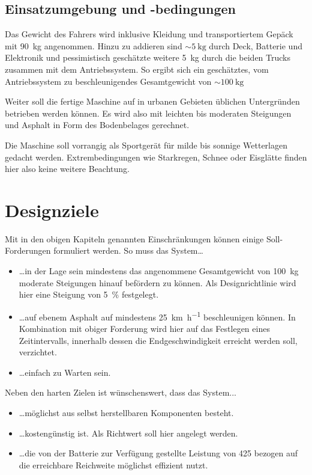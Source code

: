 		\subsection{Einsatzumgebung und -bedingungen}
			Das Gewicht des Fahrers wird inklusive Kleidung und transportiertem Gepäck mit \qty{90}{\kilo\gram} angenommen.
			Hinzu zu addieren sind \(\sim \qty{5}{\kilo\gram}\) durch Deck, Batterie und Elektronik und pessimistisch geschätzte weitere \qty{5}{\kilo\gram} durch die beiden Trucks zusammen mit dem Antriebssystem.
			So ergibt sich ein geschätztes, vom Antriebssystem zu beschleunigendes Gesamtgewicht von \(\sim \qty{100}{\kilo\gram}\)\par
			Weiter soll die fertige Maschine auf in urbanen Gebieten üblichen Untergründen betrieben werden können.
			Es wird also mit leichten bis moderaten Steigungen und Asphalt in Form des Bodenbelages gerechnet.\par\medskip
			Die Maschine soll vorrangig als Sportgerät für milde bis sonnige Wetterlagen gedacht werden.
			Extrembedingungen wie Starkregen, Schnee oder Eisglätte finden hier also keine weitere Beachtung.

	\section{Designziele}
		Mit in den obigen Kapiteln genannten Einschränkungen können einige Soll-Forderungen formuliert werden.
		So muss das System\ldots
		\begin{itemize}
			\item \ldots in der Lage sein mindestens das angenommene Gesamtgewicht von \qty{100}{\kilo\gram} moderate Steigungen hinauf befördern zu können.
			Als Designrichtlinie wird hier eine Steigung von \qty{5}{\percent} festgelegt.
			\item \ldots auf ebenem Asphalt auf mindestens \qty{25}{\kilo\metre\per\hour} beschleunigen können.
			In Kombination mit obiger Forderung wird hier auf das Festlegen eines Zeitintervalls, innerhalb dessen die Endgeschwindigkeit erreicht werden soll, verzichtet.
			\item \ldots einfach zu Warten sein.
		\end{itemize}
		Neben den harten Zielen ist wünschenswert, dass das System...
		\begin{itemize}
			\item \ldots möglichst aus selbst herstellbaren Komponenten besteht.
			\item \ldots kostengünstig ist.
			Als Richtwert soll hier  angelegt werden.
			\item \ldots die von der Batterie zur Verfügung gestellte Leistung von \SI{425}{\watthour} bezogen auf die erreichbare Reichweite möglichst effizient nutzt.
		\end{itemize}